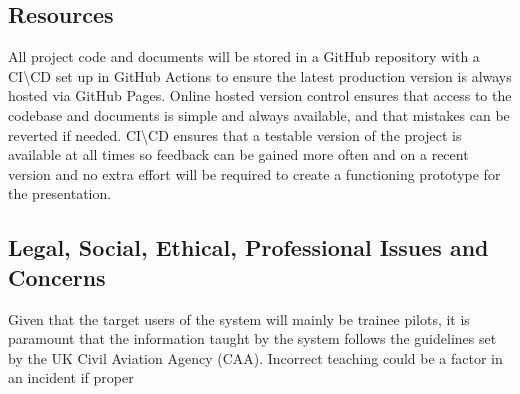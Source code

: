 \subsection{Resources}
All project code and documents will be stored in a GitHub repository with a CI\textbackslash CD set up in GitHub Actions to ensure the latest production version is always hosted via GitHub Pages. Online hosted version control ensures that access to the codebase and documents is simple and always available, and that mistakes can be reverted if needed. CI\textbackslash CD ensures that a testable version of the project is available at all times so feedback can be gained more often and on a recent version and no extra effort will be required to create a functioning prototype for the presentation.
\subsection{Legal, Social, Ethical, Professional Issues and Concerns}
Given that the target users of the system will mainly be trainee pilots, it is paramount that the information taught by the system follows the guidelines set by the UK Civil Aviation Agency (CAA). Incorrect teaching could be a factor in an incident if proper 